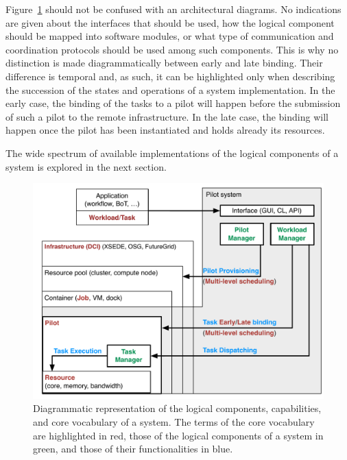 \documentclass{sig-alternate}
\begin{document}
Figure~\ref{fig:core_vocabulary} should not be confused with an architectural
diagrams. No indications are given about the interfaces that should be used,
how the logical component should be mapped into software modules, or what type
of communication and coordination protocols should be used among such
components. This is why no distinction is made diagrammatically between early
and late binding. Their difference is temporal and, as such, it can be
highlighted only when describing the succession of the states and operations of
a \pilot system implementation. In the early case, the binding of the tasks to
a pilot will happen before the submission of such a pilot to the remote
infrastructure. In the late case, the binding will happen once the pilot has
been instantiated and holds already its resources.

The wide spectrum of available implementations of the logical components of a
\pilot system is explored in the next section.

\begin{figure}[t]
    \centering
        \includegraphics[width=.48\textwidth]{figures/core_vocabulary.pdf}
    \caption{Diagrammatic representation of the logical components,
             capabilities, and core vocabulary of a \pilot system. The terms of
             the core vocabulary are highlighted in red, those of the logical
             components of a \pilot system in green, and those of their
             functionalities in blue.}
    \label{fig:core_vocabulary}
\end{figure}

 

 
\end{document}
